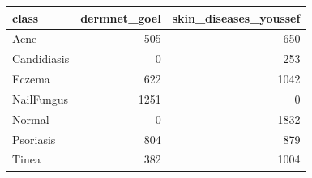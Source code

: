 \begin{tabular}{lrr}
\toprule
class & dermnet\_goel & skin\_diseases\_youssef \\
\midrule
Acne & 505 & 650 \\
Candidiasis & 0 & 253 \\
Eczema & 622 & 1042 \\
NailFungus & 1251 & 0 \\
Normal & 0 & 1832 \\
Psoriasis & 804 & 879 \\
Tinea & 382 & 1004 \\
\bottomrule
\end{tabular}
